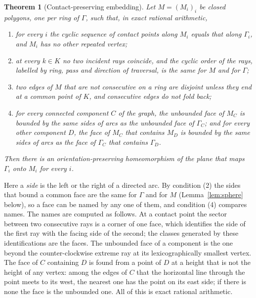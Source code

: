 \documentclass[11pt,a4paper]{article}
\newtheorem{theorem}{Theorem}
\theoremstyle{definition}
\theoremstyle{remark}
\begin{document}
\begin{theorem}[Contact-preserving embedding]\label{thm:contact}
Let $M=(M_i)_i$ be closed polygons, one per ring of $\Gamma$, such that, in
exact rational arithmetic,
\begin{enumerate}
\item for every $i$ the cyclic sequence of contact points along $M_i$ equals
  that along $\Gamma_i$, and $M_i$ has no other repeated vertex;
\item at every $k\in K$ no two incident rays coincide, and the cyclic order of
  the rays, labelled by ring, pass and direction of traversal, is the same for
  $M$ and for $\Gamma$;
\item two edges of $M$ that are not consecutive on a ring are disjoint unless
  they end at a common point of $K$, and consecutive edges do not fold back;
\item for every connected component $C$ of the graph, the unbounded face of
  $M_C$ is bounded by the same sides of arcs as the unbounded face of
  $\Gamma_C$; and for every other component $D$, the face of $M_C$ that
  contains $M_D$ is bounded by the same sides of arcs as the face of
  $\Gamma_C$ that contains $\Gamma_D$.
\end{enumerate}
Then there is an orientation-preserving homeomorphism of the plane that maps
$\Gamma_i$ onto $M_i$ for every $i$.
\end{theorem}

Here a \emph{side} is the left or the right of a directed arc. By condition
(2) the sides that bound a common face are the same for $\Gamma$ and for $M$
(Lemma~\ref{lem:sphere} below), so a face can be named by any one of them, and
condition (4) compares names. The names are computed as follows. At a contact
point the sector between two consecutive rays is a corner of one face, which
identifies the side of the first ray with the facing side of the second; the
classes generated by these identifications are the faces. The unbounded face
of a component is the one beyond the counter-clockwise extreme ray at its
lexicographically smallest vertex. The face of $C$ containing $D$ is found
from a point of $D$ at a height that is not the height of any vertex: among
the edges of $C$ that the horizontal line through the point meets to its west,
the nearest one has the point on its east side; if there is none the face is
the unbounded one. All of this is exact rational arithmetic.
\end{document}
